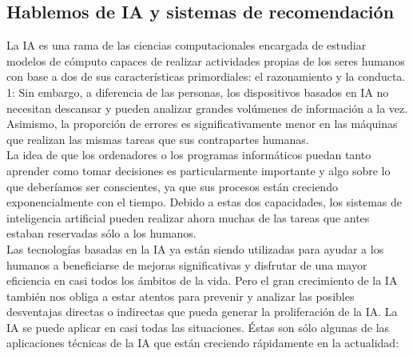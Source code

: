 \subsection{Hablemos de IA y sistemas de recomendación}
    La IA es una rama de las ciencias computacionales encargada de estudiar modelos de cómputo capaces de realizar actividades propias de los seres humanos con base a dos de sus características primordiales: el razonamiento y la conducta. 1: Sin embargo, a diferencia de las personas, los dispositivos basados en IA no necesitan descansar y pueden analizar grandes volúmenes de información a la vez. Asimismo, la proporción de errores es significativamente menor en las máquinas que realizan las mismas tareas que sus contrapartes humanas.\\
    \newline
    La idea de que los ordenadores o los programas informáticos puedan tanto aprender como tomar decisiones es particularmente importante y algo sobre lo que deberíamos ser conscientes, ya que sus procesos están creciendo exponencialmente con el tiempo. Debido a estas dos capacidades, los sistemas de inteligencia artificial pueden realizar ahora muchas de las tareas que antes estaban reservadas sólo a los humanos. \\
    \newline
    Las tecnologías basadas en la IA ya están siendo utilizadas para ayudar a los humanos a beneficiarse de mejoras significativas y disfrutar de una mayor eficiencia en casi todos los ámbitos de la vida. Pero el gran crecimiento de la IA también nos obliga a estar atentos para prevenir y analizar las posibles desventajas directas o indirectas que pueda generar la proliferación de la IA. La IA se puede aplicar en casi todas las situaciones. Éstas son sólo algunas de las aplicaciones técnicas de la IA que están creciendo rápidamente en la actualidad:
